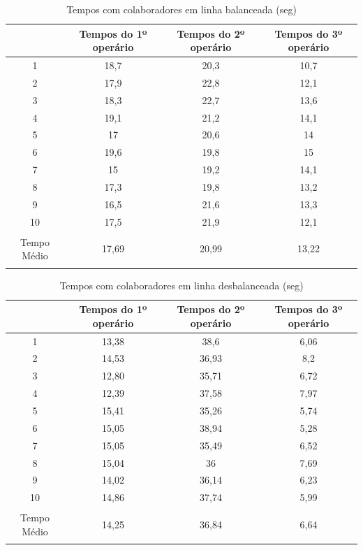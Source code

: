 \documentclass[
	12pt,				%
	oneside,			%
	a4paper,			%
	english,			%
	french,				%
	spanish,			%
	brazil,				%
	]{abntex2}
\begin{document}
\begin{table}[H]
\centering
\caption{Tempos com colaboradores em linha balanceada (seg)}
\begin{tabular}{c|c|c|c}

	&Tempos do 1º operário	&		Tempos do 2º operário		&	Tempos do 3º operário	\\ \hline
1&	18,7	&		20,3	&		10,7		\\ \hline
2&	17,9	&		22,8	&		12,1		\\ \hline
3&	18,3	&		22,7	&		13,6		\\ \hline
4&	19,1	&		21,2	&		14,1		\\ \hline
5&	17		&	20,6		&	14		\\ \hline
6&	19,6	&		19,8	&		15		\\ \hline
7&	15		&	19,2		&	14,1		\\ \hline
8&	17,3	&		19,8	&		13,2		\\ \hline
9	&16,5	&		21,6	&		13,3		\\ \hline
10&	17,5	&		21,9	&		12,1		\\ \hline
Tempo Médio	&17,69		&	20,99		&	13,22		
									

\label{tab4}
\end{tabular}	
\end{table}

\begin{table}[H]
\centering
\caption{Tempos com colaboradores em linha desbalanceada (seg)}
\begin{tabular}{c|c|c|c}

	&Tempos do 1º operário		&	Tempos do 2º operário	&		Tempos do 3º operário		\\ \hline
1&	13,38		&	38,6	&		6,06		\\ \hline
2	&14,53		&	36,93		&	8,2		\\ \hline
3	&12,80		&	35,71	&		6,72		\\ \hline
4	&12,39		&	37,58	&		7,97		\\ \hline
5	&15,41		&	35,26	&		5,74		\\ \hline
6	&15,05		&	38,94	&		5,28 \\ \hline
7	&15,05		&	35,49	&		6,52		\\ \hline
8	&15,04		&	36		&	7,69		\\ \hline
9	&14,02		&	36,14	&		6,23		\\ \hline
10	&14,86		&	37,74	&		5,99		\\ \hline
Tempo Médio&	14,25		&	36,84		&	6,64		
									
\label{tab3}
\end{tabular}	
\end{table}
\end{document}
